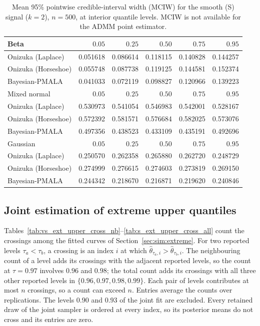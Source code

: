 \begin{table}[!htbp]
\centering
\small
\caption{Mean 95\% pointwise credible-interval width (MCIW) for the smooth (S) signal ($k=2$), $n=500$, at interior quantile levels. MCIW is not available for the ADMM point estimator.}
\label{tab:s_int_mciw}
\begin{tabular}{lrrrrr}
\toprule
Beta & $0.05$ & $0.25$ & $0.50$ & $0.75$ & $0.95$ \\
\midrule
Onizuka (Laplace) & 0.051618 & 0.086614 & 0.118115 & 0.140828 & 0.144257 \\
Onizuka (Horseshoe) & 0.055748 & 0.087738 & 0.119125 & 0.144581 & 0.152374 \\
Bayesian-PMALA & 0.041033 & 0.072119 & 0.098827 & 0.120966 & 0.139223 \\
\midrule
Mixed normal & $0.05$ & $0.25$ & $0.50$ & $0.75$ & $0.95$ \\
\midrule
Onizuka (Laplace) & 0.530973 & 0.541054 & 0.546983 & 0.542001 & 0.528167 \\
Onizuka (Horseshoe) & 0.572392 & 0.581571 & 0.576684 & 0.582025 & 0.573076 \\
Bayesian-PMALA & 0.497356 & 0.438523 & 0.433109 & 0.435191 & 0.492696 \\
\midrule
Gaussian & $0.05$ & $0.25$ & $0.50$ & $0.75$ & $0.95$ \\
\midrule
Onizuka (Laplace) & 0.250570 & 0.262358 & 0.265880 & 0.262720 & 0.248729 \\
Onizuka (Horseshoe) & 0.274999 & 0.276615 & 0.274603 & 0.273819 & 0.269150 \\
Bayesian-PMALA & 0.244342 & 0.218670 & 0.216871 & 0.219620 & 0.240846 \\
\bottomrule
\end{tabular}
\end{table}


\clearpage
\subsection{Joint estimation of extreme upper quantiles}
\label{app:sim:joint_extreme}

Tables~\ref{tab:vs_ext_upper_cross_nb}--\ref{tab:s_ext_upper_cross_all} count the crossings among the fitted curves of Section~\ref{sec:sim:extreme}. For two reported levels $\tau_a<\tau_b$, a crossing is an index $i$ at which $\widehat{\theta}_{\tau_a,i}>\widehat{\theta}_{\tau_b,i}$. The neighbouring count of a level adds its crossings with the adjacent reported levels, so the count at $\tau=0.97$ involves $0.96$ and $0.98$; the total count adds its crossings with all three other reported levels in $\{0.96,0.97,0.98,0.99\}$. Each pair of levels contributes at most $n$ crossings, so a count can exceed $n$. Entries average the counts over replications. The levels $0.90$ and $0.93$ of the joint fit are excluded. Every retained draw of the joint sampler is ordered at every index, so its posterior means do not cross and its entries are zero.

